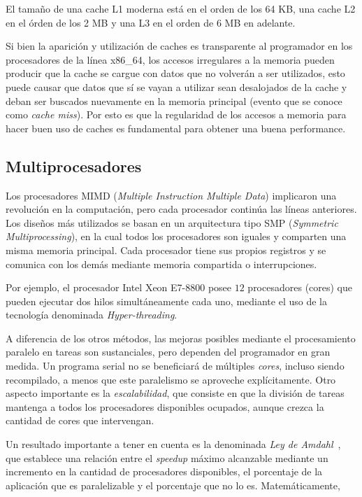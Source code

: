El tama\~no de una cache L1 moderna est\'a en el orden de los 64 KB, una cache L2 en el \'orden de los 2 MB y una L3 en el orden de 6 MB en adelante.

Si bien la aparici\'on y utilizaci\'on de caches es transparente al programador en los procesadores de la l\'inea x86\_64, los accesos irregulares a la memoria pueden producir que la cache se cargue con datos que no volver\'an a ser utilizados, esto puede causar que datos que s\'i se vayan a utilizar sean desalojados de la cache y deban ser buscados nuevamente en la memoria principal (evento que se conoce como \textit{cache miss}).
Por esto es que la regularidad de los accesos a memoria para hacer buen uso de caches es fundamental para obtener una buena performance.

\subsection{Multiprocesadores}

Los procesadores MIMD (\textit{Multiple Instruction Multiple Data}) implicaron una revoluci\'on en la computaci\'on, pero cada procesador contin\'ua las l\'ineas anteriores.
Los dise\~nos m\'as utilizados se basan en un arquitectura tipo SMP (\textit{Symmetric Multiprocessing}), en la cual todos los procesadores son iguales y comparten una misma memoria principal.
Cada procesador tiene sus propios registros y se comunica con los dem\'as mediante memoria compartida o interrupciones.

Por ejemplo, el procesador Intel Xeon E7-8800 posee $12$ procesadores (cores) que pueden ejecutar dos hilos simult\'aneamente cada uno, mediante el uso de la tecnolog\'ia denominada \textit{Hyper-threading}.

A diferencia de los otros m\'etodos, las mejoras posibles mediante el procesamiento paralelo en tareas son sustanciales, pero dependen del programador en gran medida.
Un programa serial no se beneficiar\'a de m\'ultiples \textit{cores}, incluso siendo recompilado, a menos que este paralelismo se aproveche expl\'icitamente.
Otro aspecto importante es la \textit{escalabilidad}, que consiste en que la divisi\'on de tareas mantenga a todos los procesadores disponibles ocupados, aunque crezca la cantidad de cores que intervengan.

Un resultado importante a tener en cuenta es la denominada \textit{Ley de Amdahl}~\cite{Amdahl1967}, que establece una relaci\'on entre el \textit{speedup} m\'aximo alcanzable mediante un incremento en la cantidad de procesadores disponibles, el porcentaje
de la aplicaci\'on que es paralelizable y el porcentaje que no lo es. Matem\'aticamente,


